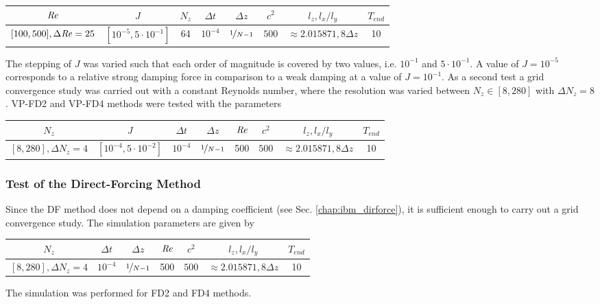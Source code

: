 \begin{center}
\vspace*{0.5ex}
\begin{tabular}{c|c|c|c|c|c|c|c }
 $ \mbox{\textit{Re}}  $                      & $J$ & $N_z$ &  $\Delta t$ & $\Delta z$            & $c^2$   & $l_z, l_x/l_y$ & $T_{end}$\\
\hline
 $[100, 500], \Delta \mbox{\textit{Re}} = 25 $& $[10^{-5}, 5\cdot10^{-1}]  $ & 64 &  $10^{-4}$ & $\nicefrac{1}{N - 1}$   & $500$   & $\approx{2.015871}, 8\Delta z$ & 10\\
\end{tabular}
\vspace*{0.5ex}
\end{center}

The stepping of $J$ was varied such that each order of magnitude is covered by two values, i.e. $10^{-1}$ and $5\cdot10^{-1}$.
A value of $J=10^{-5}$ corresponds to a relative strong damping force in comparison to a weak damping at a value of $J=10^{-1}$.
As a second test a grid convergence study was carried out with a constant Reynolds number,
where the resolution was varied between $N_z\in [8, 280]$ with $\Delta N_z = 8$. VP-FD2 and VP-FD4 methods were tested with the parameters

\begin{center}
\vspace*{0.5ex}
\begin{tabular}{c|c|c|c|c|c|c|c }
 $ N_z  $                      & $J$ &  $\Delta t$ & $\Delta z$            & $\mbox{\textit{Re}}$  & $c^2$   & $l_z, l_x/l_y$ & $T_{end}$\\
\hline
 $[8, 280], \Delta N_z = 4 $& $[10^{-4}, 5\cdot10^{-2}]  $ &  $10^{-4}$ & $\nicefrac{1}{N - 1}$ & 500     & $500$   & $\approx{2.015871}, 8\Delta z$  & 10\\
\end{tabular}
\vspace*{0.5ex}
\end{center}

\subsubsection{Test of the Direct-Forcing Method}

Since the DF method does not depend on a damping coefficient (see Sec. \ref{chap:ibm_dirforce}),
it is sufficient enough to carry out a grid convergence study.  The simulation parameters are given by

\begin{center}
\vspace*{0.3ex}
\begin{tabular}{c|c|c|c|c|c|c }
 $ N_z  $                       &  $\Delta t$ & $\Delta z$            & $\mbox{\textit{Re}}$  & $c^2$   & $l_z, l_x/l_y$ & $T_{end}$\\
\hline
 $[8, 280], \Delta N_z = 4 $ &  $10^{-4}$ & $\nicefrac{1}{N - 1}$ & 500     & $500$   & $\approx{2.015871}, 8\Delta z$  & 10\\
\end{tabular}
\vspace*{0.3ex}
\end{center}
The simulation was performed for FD2 and FD4 methods.

